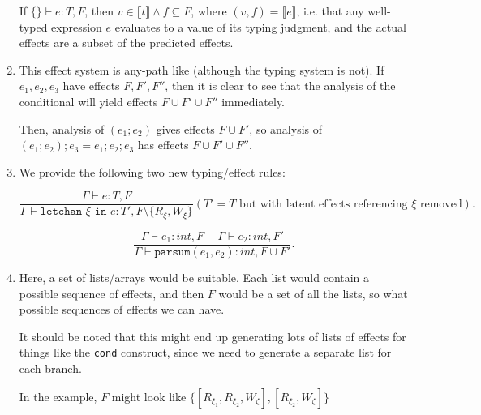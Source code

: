 \begin{enumerate}[label=(\alph*)]
    If $\{\} \vdash e : T, F$, then $v \in \llbracket t\rrbracket \wedge f \subseteq F$, where $(v,f) = \llbracket e \rrbracket$, i.e. that any well-typed expression $e$ evaluates to a value of its typing judgment, and the actual effects are a subset of the predicted effects.

  \item
    This effect system is any-path like (although the typing system is not). If $e_1, e_2, e_3$ have effects $F, F', F''$, then it is clear to see that the analysis of the conditional will yield effects $F \cup F' \cup F''$ immediately.

    Then, analysis of $(e_1;e_2)$ gives effects $F \cup F'$, so analysis of $(e_1;e_2);e_3 = e_1;e_2;e_3$ has effects $F \cup F' \cup F''$.

  \item

    We provide the following two new typing/effect rules:

    \[
      \frac{\Gamma \vdash e : T, F}{\Gamma \vdash \texttt{letchan }\xi\texttt{ in }e : T', F \setminus \{R_\xi, W_\xi\}}(\text{$T' = T$ but with latent effects referencing $\xi$ removed})
    .\] 

    \[
      \frac{\Gamma \vdash e_1 : int, F \hspace{15pt} \Gamma \vdash e_2 : int, F'}{\Gamma \vdash \texttt{parsum}(e_1, e_2) : int, F \cup F'}
    .\] 

  \item
    Here, a set of lists/arrays would be suitable. Each list would contain a possible sequence of effects, and then $F$ would be a set of all the lists, so what possible sequences of effects we can have.

    It should be noted that this might end up generating lots of lists of effects for things like the \texttt{cond} construct, since we need to generate a separate list for each branch.

    In the example, $F$ might look like $\{[R_{\xi_1}, R_{\xi_2}, W_{\zeta}], [R_{\xi_2}, W_\zeta]\}$




        
\end{enumerate}

